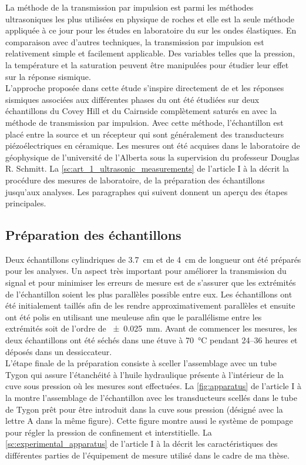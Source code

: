 La méthode de la transmission par impulsion est parmi les méthodes ultrasoniques les plus utilisées en physique de roches \citep{Wyllie1958,Nur1971,Timur1977,Toksz1979,Tosaya1982,Blair1990,Wang1991,Cadoret1995,Adam2006,Verwer2008,Yam2011,Njiekak2013,Schmitt2015} et elle est la seule méthode appliquée à ce jour pour les études en laboratoire du  sur les ondes élastiques. En comparaison avec d'autres techniques, la transmission par impulsion est relativement simple et facilement applicable. Des variables telles que la pression, la température et la saturation peuvent être manipulées pour étudier leur effet sur la réponse sismique. \\ 
L'approche proposée dans cette étude s'inspire directement de \citet{Schmitt2015} et les réponses sismiques associées aux différentes phases du  ont été étudiées sur deux échantillons du Covey Hill et du Cairnside complètement saturés en  avec la méthode de transmission par impulsion. Avec cette méthode, l'échantillon est placé entre la source et un récepteur qui sont généralement des transducteurs piézoélectriques en céramique. Les mesures ont été acquises dans le laboratoire de géophysique de l'université de l'Alberta sous la supervision du professeur Douglas R. Schmitt. La \cref{sc:art_1_ultrasonic_measurements} de l'article I à la  décrit la procédure des mesures de laboratoire, de la préparation des échantillons jusqu'aux analyses. Les paragraphes qui suivent donnent un aperçu des étapes principales.
\subsection{Préparation des échantillons}
Deux échantillons cylindriques de \SI{3.7}{\cm} et de \SI{4}{\cm} de longueur ont été préparés pour les analyses. Un aspect très important pour améliorer la transmission du signal et pour minimiser les erreurs de mesure est de s'assurer que les extrémités de l'échantillon soient les plus parallèles possible entre eux. Les échantillons ont été initialement taillés afin de les rendre approximativement parallèles et ensuite ont été polis en utilisant une meuleuse afin que le parallélisme entre les extrémités soit de l'ordre de \SI{\pm0.025}{\mm}. Avant de commencer les mesures, les deux échantillons ont été séchés dans une étuve à \SI{70}{\degreeCelsius} pendant \numrange{24}{36} heures et déposés dans un dessiccateur.\\
L'étape finale de la préparation consiste à sceller l'assemblage avec un tube Tygon\texttrademark{} qui assure l’étanchéité à l'huile hydraulique présente à l’intérieur de la cuve sous pression où les mesures sont effectuées. La \cref{fig:apparatus} de l’article I à la  montre l'assemblage de l'échantillon avec les transducteurs scellés dans le tube de Tygon\texttrademark{} prêt pour être introduit dans la cuve sous pression (désigné avec la lettre A dans la même figure). Cette figure montre aussi le système de pompage pour régler la pression de confinement et interstitielle. La \cref{sc:experimental_apparatus} de l'article I à la  décrit les caractéristiques des différentes parties de l'équipement de mesure utilisé dans le cadre de ma thèse.
